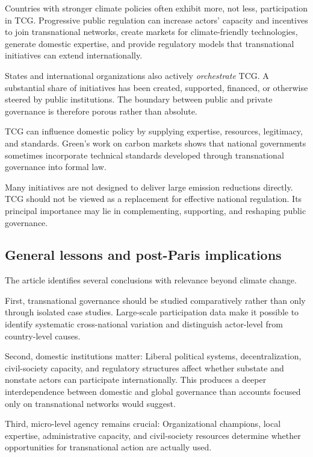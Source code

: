 Countries with stronger climate policies often exhibit more, not less, participation in TCG. Progressive public regulation can increase actors' capacity and incentives to join transnational networks, create markets for climate-friendly technologies, generate domestic expertise, and provide regulatory models that transnational initiatives can extend internationally.

States and international organizations also actively \textit{orchestrate} TCG. A substantial share of initiatives has been created, supported, financed, or otherwise steered by public institutions. The boundary between public and private governance is therefore porous rather than absolute.

TCG can influence domestic policy by supplying expertise, resources, legitimacy, and standards. Green's work on carbon markets shows that national governments sometimes incorporate technical standards developed through transnational governance into formal law.

Many initiatives are not designed to deliver large emission reductions directly. TCG should not be viewed as a replacement for effective national regulation. Its principal importance may lie in complementing, supporting, and reshaping public governance.

\subsection{General lessons and post-Paris implications}

The article identifies several conclusions with relevance beyond climate change.

First, transnational governance should be studied comparatively rather than only through isolated case studies. Large-scale participation data make it possible to identify systematic cross-national variation and distinguish actor-level from country-level causes.

Second, domestic institutions matter: Liberal political systems, decentralization, civil-society capacity, and regulatory structures affect whether substate and nonstate actors can participate internationally. This produces a deeper interdependence between domestic and global governance than accounts focused only on transnational networks would suggest.

Third, micro-level agency remains crucial: Organizational champions, local expertise, administrative capacity, and civil-society resources determine whether opportunities for transnational action are actually used.

